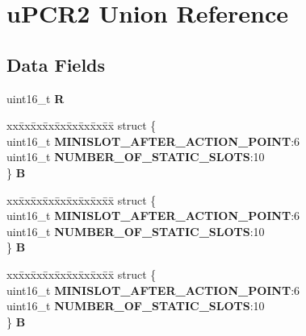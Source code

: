 \hypertarget{unionuPCR2}{}\section{u\+P\+C\+R2 Union Reference}
\label{unionuPCR2}
\subsection*{Data Fields}
\begin{DoxyCompactItemize}
\item 
\mbox{\label{unionuPCR2_a8d31d061930cd5d7f6454a3ffb1a8741}} 
uint16\+\_\+t {\bfseries R}
\item 
\mbox{\label{unionuPCR2_ad4845dd25d0b457ee9d55725db697983}} 
\begin{tabbing}
xx\=xx\=xx\=xx\=xx\=xx\=xx\=xx\=xx\=\kill
struct \{\\
\>uint16\_t {\bfseries MINISLOT\_AFTER\_ACTION\_POINT}:6\\
\>uint16\_t {\bfseries NUMBER\_OF\_STATIC\_SLOTS}:10\\
\} {\bfseries B}\\

\end{tabbing}\item 
\mbox{\label{unionuPCR2_a3212af996be80b2d2c2db943954d362b}} 
\begin{tabbing}
xx\=xx\=xx\=xx\=xx\=xx\=xx\=xx\=xx\=\kill
struct \{\\
\>uint16\_t {\bfseries MINISLOT\_AFTER\_ACTION\_POINT}:6\\
\>uint16\_t {\bfseries NUMBER\_OF\_STATIC\_SLOTS}:10\\
\} {\bfseries B}\\

\end{tabbing}\item 
\mbox{\label{unionuPCR2_a0477bf234d1cc2ef8fa7f30b85930c2c}} 
\begin{tabbing}
xx\=xx\=xx\=xx\=xx\=xx\=xx\=xx\=xx\=\kill
struct \{\\
\>uint16\_t {\bfseries MINISLOT\_AFTER\_ACTION\_POINT}:6\\
\>uint16\_t {\bfseries NUMBER\_OF\_STATIC\_SLOTS}:10\\
\} {\bfseries B}\\


\end{tabbing}
\end{DoxyCompactItemize}
